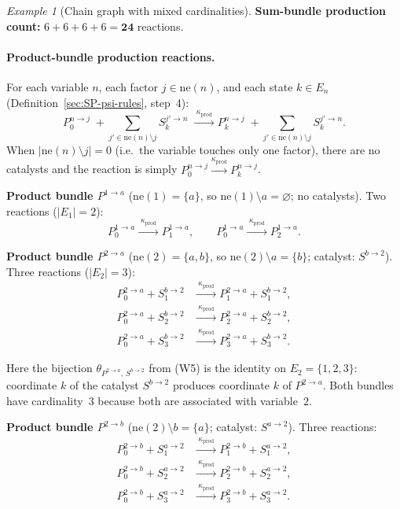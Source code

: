 \documentclass{article}
\theoremstyle{plain}
\theoremstyle{definition}
\theoremstyle{remark}
\newtheorem{example}{Example}[section]
\newcommand{\<}{\langle}
\renewcommand{\>}{\rangle}
\begin{document}
\begin{example}[Chain graph with mixed cardinalities]
\noindent
\textbf{Sum-bundle production count:} $6+6+6+6 = \mathbf{24}$ reactions.
 
 
\paragraph{Product-bundle production reactions.}
For each variable $n$, each factor $j\in\mathrm{ne}(n)$,
and each state $k\in E_n$ (Definition~\ref{sec:SP-psi-rules}, step~4):
\[
P^{n\to j}_0
\;+\!\!\sum_{j'\in\mathrm{ne}(n)\setminus j}\!\! S^{j'\to n}_k
\;\xrightarrow{\;\kappa_{\mathrm{prod}}\;}
P^{n\to j}_k
\;+\!\!\sum_{j'\in\mathrm{ne}(n)\setminus j}\!\! S^{j'\to n}_k.
\]
When $|\mathrm{ne}(n)\setminus j|=0$ (i.e.\ the variable touches
only one factor), there are no catalysts and the reaction
is simply $P^{n\to j}_0 \xrightarrow{\kappa_{\mathrm{prod}}} P^{n\to j}_k$.
 
\smallskip
\noindent\textbf{Product bundle $P^{1\to a}$}
($\mathrm{ne}(1)=\{a\}$, so $\mathrm{ne}(1)\setminus a = \varnothing$;
no catalysts).
Two reactions ($|E_1|=2$):
\[
P^{1\to a}_0
\xrightarrow{\;\kappa_{\mathrm{prod}}\;}
P^{1\to a}_1,
\qquad
P^{1\to a}_0
\xrightarrow{\;\kappa_{\mathrm{prod}}\;}
P^{1\to a}_2.
\]
 
\smallskip
\noindent\textbf{Product bundle $P^{2\to a}$}
($\mathrm{ne}(2)=\{a,b\}$, so $\mathrm{ne}(2)\setminus a = \{b\}$;
catalyst: $S^{b\to 2}$).
Three reactions ($|E_2|=3$):
\begin{align*}
P^{2\to a}_0 + S^{b\to 2}_1
&\xrightarrow{\;\kappa_{\mathrm{prod}}\;}
P^{2\to a}_1 + S^{b\to 2}_1, \\
P^{2\to a}_0 + S^{b\to 2}_2
&\xrightarrow{\;\kappa_{\mathrm{prod}}\;}
P^{2\to a}_2 + S^{b\to 2}_2, \\
P^{2\to a}_0 + S^{b\to 2}_3
&\xrightarrow{\;\kappa_{\mathrm{prod}}\;}
P^{2\to a}_3 + S^{b\to 2}_3.
\end{align*}
 
\noindent
Here the bijection $\theta_{P^{2\to a},\, S^{b\to 2}}$ from (W5)
is the identity on $E_2=\{1,2,3\}$: coordinate $k$ of the catalyst
$S^{b\to 2}$ produces coordinate $k$ of $P^{2\to a}$.
Both bundles have cardinality~$3$ because both are associated
with variable~$2$.
 
\smallskip
\noindent\textbf{Product bundle $P^{2\to b}$}
($\mathrm{ne}(2)\setminus b = \{a\}$;
catalyst: $S^{a\to 2}$).
Three reactions:
\begin{align*}
P^{2\to b}_0 + S^{a\to 2}_1
&\xrightarrow{\;\kappa_{\mathrm{prod}}\;}
P^{2\to b}_1 + S^{a\to 2}_1, \\
P^{2\to b}_0 + S^{a\to 2}_2
&\xrightarrow{\;\kappa_{\mathrm{prod}}\;}
P^{2\to b}_2 + S^{a\to 2}_2, \\
P^{2\to b}_0 + S^{a\to 2}_3
&\xrightarrow{\;\kappa_{\mathrm{prod}}\;}
P^{2\to b}_3 + S^{a\to 2}_3.
\end{align*}
 

\end{example}
\end{document}
